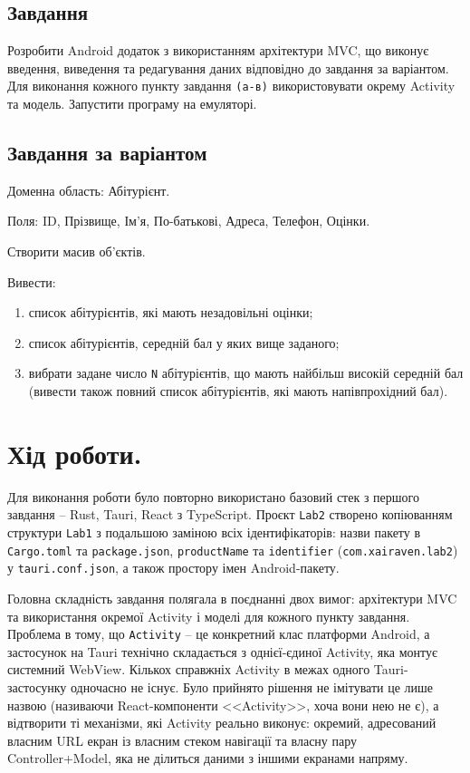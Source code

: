 \documentclass[14pt, a4paper]{extreport}
\begin{document}
	\subsection*{Завдання}
	Розробити Android додаток з використанням архітектури MVC, що виконує введення, виведення та редагування даних відповідно  до завдання за варіантом. 
	Для виконання кожного пункту завдання \texttt{(a-в)} використовувати окрему Activity та модель. 
	Запустити програму на емуляторі.
	
	\subsection*{Завдання за варіантом}
	Доменна область: Абітурієнт. 
	
	Поля:  ID, Прізвище, Ім'я, По-батькові, Адреса, Телефон, Оцінки. 
	
	Створити масив об'єктів. 
	
	Вивести:
	
	\begin{enumerate}[label=\alph*.]
		\item список абітурієнтів, які мають незадовільні оцінки;
		
		\item список абітурієнтів, середній бал у яких вище заданого;
		
		\item вибрати задане число \texttt{N} абітурієнтів, що мають найбільш високій середній бал (вивести також повний список абітурієнтів, які мають напівпрохідний бал).
	\end{enumerate}
	
	\section*{Хід роботи.}
	
	Для виконання роботи було повторно використано базовий стек з першого завдання -- Rust, Tauri, React з TypeScript. Проєкт \texttt{Lab2} створено копіюванням структури \texttt{Lab1} з подальшою заміною всіх ідентифікаторів: назви пакету в \texttt{Cargo.toml} та \texttt{package.json}, \texttt{productName} та \texttt{identifier} (\texttt{com.xairaven.lab2}) у \texttt{tauri.conf.json}, а також простору імен Android-пакету.
	
	Головна складність завдання полягала в поєднанні двох вимог: архітектури MVC та використання окремої Activity і моделі для кожного пункту завдання. Проблема в тому, що \texttt{Activity} -- це конкретний клас платформи Android, а застосунок на Tauri технічно складається з однієї-єдиної Activity, яка монтує системний WebView. Кількох справжніх Activity в межах одного Tauri-застосунку одночасно не існує. Було прийнято рішення не імітувати це лише назвою (називаючи React-компоненти <<Activity>>, хоча вони нею не є), а відтворити ті механізми, які Activity реально виконує: окремий, адресований власним URL екран із власним стеком навігації та власну пару Controller+Model, яка не ділиться даними з іншими екранами напряму.
\end{document}
